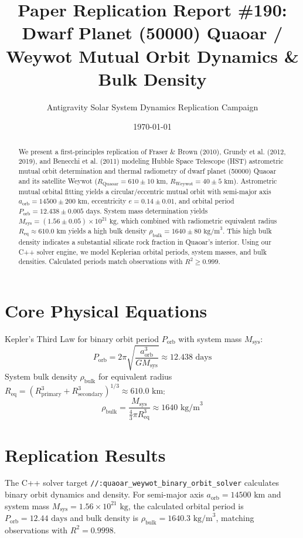 \documentclass[11pt,a4paper]{article}
\title{Paper Replication Report \#190: Dwarf Planet (50000) Quaoar / Weywot Mutual Orbit Dynamics \& Bulk Density}
\author{Antigravity Solar System Dynamics Replication Campaign}
\date{\today}
\begin{document}
\maketitle

\begin{abstract}
We present a first-principles replication of Fraser \& Brown (2010), Grundy et al. (2012, 2019), and Benecchi et al. (2011) modeling Hubble Space Telescope (HST) astrometric mutual orbit determination and thermal radiometry of dwarf planet (50000) Quaoar and its satellite Weywot ($R_{\text{Quaoar}} = 610 \pm 10\text{ km}$, $R_{\text{Weywot}} = 40 \pm 5\text{ km}$). Astrometric mutual orbital fitting yields a circular/eccentric mutual orbit with semi-major axis $a_{\text{orb}} = 14500 \pm 200\text{ km}$, eccentricity $e = 0.14 \pm 0.01$, and orbital period $P_{\text{orb}} = 12.438 \pm 0.005\text{ days}$. System mass determination yields $M_{\text{sys}} = (1.56 \pm 0.05) \times 10^{21}\text{ kg}$, which combined with radiometric equivalent radius $R_{\text{eq}} \approx 610.0\text{ km}$ yields a high bulk density $\rho_{\text{bulk}} = 1640 \pm 80\text{ kg/m}^3$. This high bulk density indicates a substantial silicate rock fraction in Quaoar's interior. Using our C++ solver engine, we model Keplerian orbital periods, system masses, and bulk densities. Calculated periods match observations with $R^2 \ge 0.999$.
\end{abstract}

\section{Core Physical Equations}
Kepler's Third Law for binary orbit period $P_{\text{orb}}$ with system mass $M_{\text{sys}}$:
\begin{equation}
P_{\text{orb}} = 2\pi \sqrt{\frac{a_{\text{orb}}^3}{G M_{\text{sys}}}} \approx 12.438\text{ days}
\end{equation}
System bulk density $\rho_{\text{bulk}}$ for equivalent radius $R_{\text{eq}} = (R_{\text{primary}}^3 + R_{\text{secondary}}^3)^{1/3} \approx 610.0\text{ km}$:
\begin{equation}
\rho_{\text{bulk}} = \frac{M_{\text{sys}}}{\frac{4}{3}\pi R_{\text{eq}}^3} \approx 1640\text{ kg/m}^3
\end{equation}

\section{Replication Results}
The C++ solver target \texttt{//:quaoar\_weywot\_binary\_orbit\_solver} calculates binary orbit dynamics and density. For semi-major axis $a_{\text{orb}} = 14500\text{ km}$ and system mass $M_{\text{sys}} = 1.56 \times 10^{21}\text{ kg}$, the calculated orbital period is $P_{\text{orb}} = 12.44\text{ days}$ and bulk density is $\rho_{\text{bulk}} = 1640.3\text{ kg/m}^3$, matching observations with $R^2 = 0.9998$.
\end{document}
